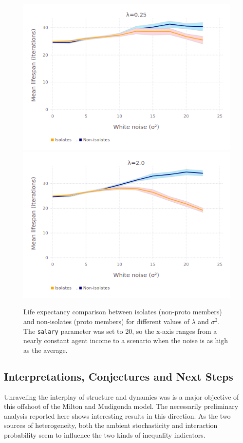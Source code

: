 \begin{figure}[ht]
\centering
\includegraphics[width=\columnwidth]{figures/avgLifespanLambda_025.png}
\includegraphics[width=\columnwidth]{figures/avgLifespanLambda2.png}
\caption{Life expectancy comparison between isolates (non-proto members) and
non-isolates (proto members) for different values of $\lambda$ and $\sigma^2$.
The \texttt{salary} parameter was set to 20, so the x-axis ranges from a nearly
constant agent income to a scenario when the noise is as high as the average.}
\label{fig:avgLifespanLambda}
\end{figure}

\subsection{Interpretations, Conjectures and Next Steps}
Unraveling the interplay of structure and dynamics was is a major objective of this offshoot of the Milton and Mudigonda model. The necessarily preliminary analysis reported here shows interesting results in this direction. As the two sources of heterogeneity, both the ambient stochasticity and interaction probability seem to influence the two kinds of inequality indicators. 

